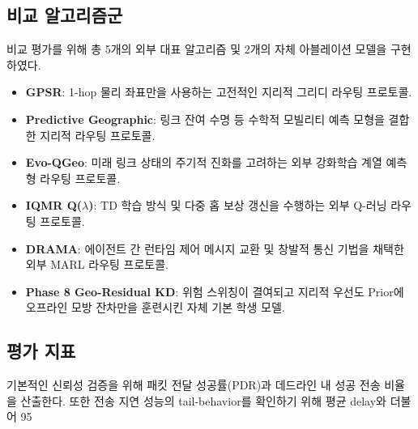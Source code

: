 \subsection{비교 알고리즘군}
비교 평가를 위해 총 5개의 외부 대표 알고리즘 및 2개의 자체 아블레이션 모델을 구현하였다.
\begin{itemize}
    \item \textbf{GPSR}: 1-hop 물리 좌표만을 사용하는 고전적인 지리적 그리디 라우팅 프로토콜.
    \item \textbf{Predictive Geographic}: 링크 잔여 수명 등 수학적 모빌리티 예측 모형을 결합한 지리적 라우팅 프로토콜.
    \item \textbf{Evo-QGeo}: 미래 링크 상태의 주기적 진화를 고려하는 외부 강화학습 계열 예측형 라우팅 프로토콜.
    \item \textbf{IQMR Q($\lambda$)}: TD 학습 방식 및 다중 홉 보상 갱신을 수행하는 외부 Q-러닝 라우팅 프로토콜.
    \item \textbf{DRAMA}: 에이전트 간 런타임 제어 메시지 교환 및 창발적 통신 기법을 채택한 외부 MARL 라우팅 프로토콜.
    \item \textbf{Phase 8 Geo-Residual KD}: 위험 스위칭이 결여되고 지리적 우선도 Prior에 오프라인 모방 잔차만을 훈련시킨 자체 기본 학생 모델.
\end{itemize}

\subsection{평가 지표}
기본적인 신뢰성 검증을 위해 패킷 전달 성공률(PDR)과 데드라인 내 성공 전송 비율을 산출한다. 또한 전송 지연 성능의 tail-behavior를 확인하기 위해 평균 delay와 더불어 95%
